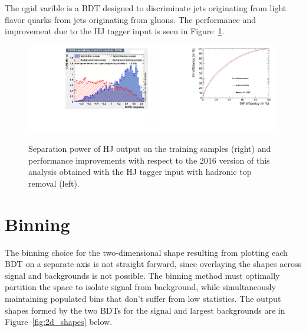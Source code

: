 \noindent The qgid varible is a BDT designed to discriminate jets originating from light flavor quarks from jets originating from gluons. The performance and improvement due
to the HJ tagger input is seen in Figure~\ref{fig:hj_tagger}.

\begin{figure}[htp]
\centering
\includegraphics[width=0.49\textwidth]{ch9_figs/Jtagger_Ks.pdf}
\includegraphics[width=0.49\textwidth]{ch9_figs/Roc_Comparison_18Feb.pdf}
\caption[Performance improvement from the HJ tagger and hadronic top removal]{Separation power of HJ output on the training samples (right) and performance improvements with respect to the 2016 version of this analysis obtained with the HJ
tagger input with hadronic top removal (left).}
\label{fig:hj_tagger}
\end{figure}

\section{Binning}
The binning choice for the two-dimensional shape resulting from plotting each BDT on a separate axis is not straight forward, since overlaying the shapes across signal and backgrounds is not possible.
The binning method must optimally partition the space to isolate
signal from background, while simultaneously maintaining populated bins that don't suffer from low statistics. The output shapes formed by the two BDTs for the signal and largest backgrounds
are in Figure~\ref{fig:2d_shapes} below. 

